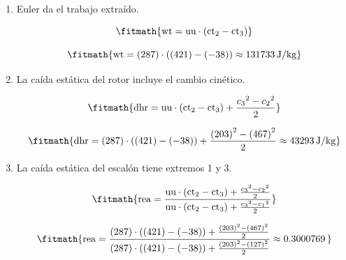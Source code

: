 \begin{enumerate}

\item Euler da el trabajo extraído.

\[\fitmath{\mathrm{wt}=\mathrm{uu}\cdot \left(\mathrm{ct}_{2}-\mathrm{ct}_{3}\right)}\]

\[\fitmath{\mathrm{wt}=(287)\cdot \left((421)-(-38)\right)\approx 131733\,\mathrm{J/kg}}\]

\item La caída estática del rotor incluye el cambio cinético.

\[\fitmath{\mathrm{dhr}=\mathrm{uu}\cdot \left(\mathrm{ct}_{2}-\mathrm{ct}_{3}\right)+\frac{{c_{3}}^{2}-{c_{2}}^{2}}{2}}\]

\[\fitmath{\mathrm{dhr}=(287)\cdot \left((421)-(-38)\right)+\frac{{(203)}^{2}-{(467)}^{2}}{2}\approx 43293\,\mathrm{J/kg}}\]

\item La caída estática del escalón tiene extremos 1 y 3.

\[\fitmath{\mathrm{rea}=\frac{\mathrm{uu}\cdot \left(\mathrm{ct}_{2}-\mathrm{ct}_{3}\right)+\frac{{c_{3}}^{2}-{c_{2}}^{2}}{2}}{\mathrm{uu}\cdot \left(\mathrm{ct}_{2}-\mathrm{ct}_{3}\right)+\frac{{c_{3}}^{2}-{c_{1}}^{2}}{2}}}\]

\[\fitmath{\mathrm{rea}=\frac{(287)\cdot \left((421)-(-38)\right)+\frac{{(203)}^{2}-{(467)}^{2}}{2}}{(287)\cdot \left((421)-(-38)\right)+\frac{{(203)}^{2}-{(127)}^{2}}{2}}\approx 0.3000769\,}\]

\end{enumerate}
